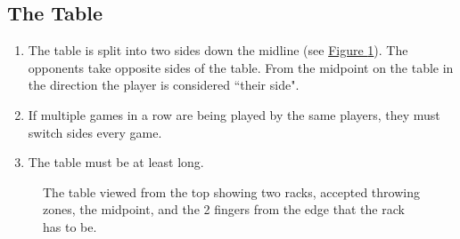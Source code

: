 	\subsection{The Table}\label{ssec:Table}
        \begin{enumerate}[label=(\roman*), ref=\roman*]
            \item \label{sssec:Table,sides} The table is split into two sides down the midline (see \hyperref[fig:table]{Figure \ref*{fig:table}}).
			    The opponents take opposite sides of the table. 
			    From the midpoint on the table in the direction the player is considered ``their side". 
            \item \label{sssec:Table,switch} If multiple games in a row are being played by the same players, they must switch sides every game. 
            \item \label{sssec:Table,length} The table must be at least  long. 
        \end{enumerate}
        \begin{figure}[H]
            \centering
            \def\svgwidth{\columnwidth}
            
            \caption{The table viewed from the top showing two racks, accepted throwing zones, the midpoint, and the 2 fingers from the edge that the rack has to be.}
            \label{fig:table}
        \end{figure}
